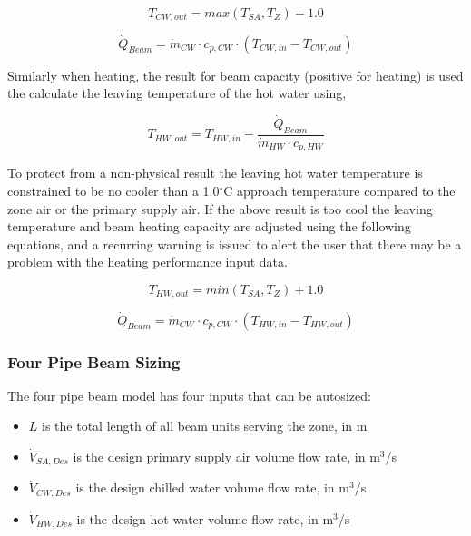\begin{equation}
  {T_{CW,out}} = { max( {T_{SA}} , {T_{Z}}) - 1.0 }
\end{equation}

\begin{equation}
  {\dot Q_{Beam}} = {\dot m_{CW}} \cdot {c_{p,CW}} \cdot {( {T_{CW,in}} - {T_{CW,out}})}
\end{equation}

Similarly when heating, the result for beam capacity (positive for heating) is used the calculate the leaving temperature of the hot water using,

\begin{equation}
{T_{HW,out}} = {T_{HW,in}} - \frac{{\dot Q_{Beam}}}{{\dot m_{HW}} \cdot {c_{p,HW}} }
\end{equation}

To protect from a non-physical result the leaving hot water temperature is constrained to be no cooler than a 1.0\(^{\circ}\)C approach temperature compared to the zone air or the primary supply air. If the above result is too cool the leaving temperature and beam heating capacity are adjusted using the following equations, and a recurring warning is issued to alert the user that there may be a problem with the heating performance input data.

\begin{equation}
  {T_{HW,out}} = { min( {T_{SA}} , {T_{Z}}) + 1.0 }
\end{equation}

\begin{equation}
  {\dot Q_{Beam}} = {\dot m_{CW}} \cdot {c_{p,CW}} \cdot {( {T_{HW,in}} - {T_{HW,out}}) }
\end{equation}

\subsubsection{Four Pipe Beam Sizing}\label{four-pipe-beam-sizing}

The four pipe beam model has four inputs that can be autosized:

\begin{itemize}
\item \({L}\) is the total length of all beam units serving the zone, in m
\item \({\dot V_{SA,Des}}\) is the design primary supply air volume flow rate, in m\(^{3}\)/s
\item \({\dot V_{CW,Des}}\) is the design chilled water volume flow rate, in m\(^{3}\)/s
\item \({\dot V_{HW,Des}}\) is the design hot water volume flow rate, in m\(^{3}\)/s
\end{itemize}

